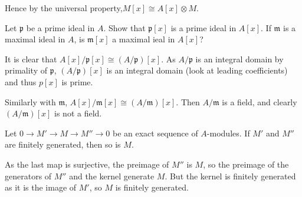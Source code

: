 \documentclass[a4paper]{exam}
\begin{document}
\begin{questions}
\begin{solution}
		Hence by the universal property,$M[x] \cong A[x] \otimes M$.
	\end{solution}

	\question Let $\mathfrak{p}$ be a prime ideal in $A$. Show that $\mathfrak{p}[x]$ is a prime ideal in $A[x]$. If $\mathfrak{m}$ is a maximal ideal in $A $, is $\mathfrak{m}[x]$ a maximal ieal in $A[x] $?
	\begin{solution}
		It is clear that $A[x] / \mathfrak{p}[x] \cong (A / \mathfrak{p})[x]$.
		As $A / \mathfrak{p}$ is an integral domain by primality of $\mathfrak{p} $, $(A / \mathfrak{p})[x]$ is an integral domain (look at leading coefficients) and thus $p[x]$ is prime.

		Similarly with $\mathfrak{m} $, $A[x] / \mathfrak{m}[x] \cong (A / \mathfrak{m})[x]$.
		Then $A / \mathfrak{m}$ is a field, and clearly $(A / \mathfrak{m})[x]$ is not a field.
	\end{solution}

	\question

	\question Let $0\to M'\to M\to M''\to 0$ be an exact sequence of $A$-modules. If $M'$ and $M''$ are finitely generated, then so is $M$.
	\begin{solution}
		As the last map is surjective, the preimage of $M''$ is $M $, so the preimage of the generators of $M''$ and the kernel generate $M$.
		But the kernel is finitely generated as it is the image of $M' $, so $M$ is finitely generated.
	\end{solution}


\end{questions}
\end{document}

